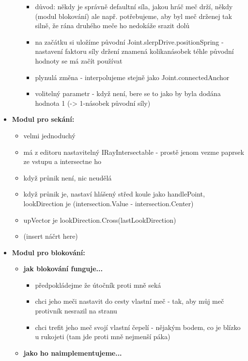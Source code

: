 \begin{itemize}
\begin{itemize}
        \begin{itemize}
          \item důvod: někdy je správně defaultní síla, jakou hráč meč drží, někdy (modul blokování) ale např. potřebujeme, aby byl meč drženej tak silně, že rána druhého meče ho nedokáže srazit dolů
          \item na začátku si uložíme původní Joint.slerpDrive.positionSpring - nastavení faktoru síly držení znamená kolikanásobek téhle původní hodnoty se má začít používat
          \item plynulá změna - interpolujeme stejně jako Joint.connectedAnchor
          \item volitelný parametr - když není, bere se to jako by byla dodána hodnota 1 (-> 1-násobek původní síly)
        \end{itemize}
    \end{itemize}
  \item \textbf{Modul pro sekání:} 
    \begin{itemize}
      \item velmi jednoduchý
      \item má z editoru nastavitelný IRayIntersectable - prostě jenom vezme paprsek ze vstupu a intersectne ho
      \item když průnik není, nic neudělá
      \item když průnik je, nastaví hlášený střed koule jako handlePoint, lookDirection je (intersection.Value - intersection.Center)
      \item upVector je lookDirection.Cross(lastLookDirection) 
      \item (insert náčrt here)
    \end{itemize}
  \item \textbf{Modul pro blokování:} 
    \begin{itemize}
      \item \textbf{jak blokování funguje...}
        \begin{itemize}
          \item předpokládejme že útočník proti mně seká
          \item chci jeho meči nastavit do cesty vlastní meč - tak, aby můj meč protivník nesrazil na stranu
          \item chci trefit jeho meč svojí vlastní čepelí - nějakým bodem, co je blízko u rukojeti (tam jde proti mně nejmenší páka) 
        \end{itemize}
      \item \textbf{jako ho naimplementujeme...}

\end{itemize}
\end{itemize}
